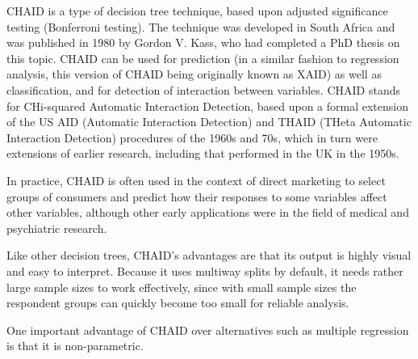 CHAID is a type of decision tree technique, based upon adjusted significance testing (Bonferroni testing). The technique was developed in South Africa and was published in 1980 by Gordon V. Kass, who had completed a PhD thesis on this topic. CHAID can be used for prediction (in a similar fashion to regression analysis, this version of CHAID being originally known as XAID) as well as classification, and for detection of interaction between variables. CHAID stands for CHi-squared Automatic Interaction Detection, based upon a formal extension of the US AID (Automatic Interaction Detection) and THAID (THeta Automatic Interaction Detection) procedures of the 1960s and 70s, which in turn were extensions of earlier research, including that performed in the UK in the 1950s.

In practice, CHAID is often used in the context of direct marketing to select groups of consumers and predict how their responses to some variables affect other variables, although other early applications were in the field of medical and psychiatric research.

Like other decision trees, CHAID's advantages are that its output is highly visual and easy to interpret. Because it uses multiway splits by default, it needs rather large sample sizes to work effectively, since with small sample sizes the respondent groups can quickly become too small for reliable analysis.

One important advantage of CHAID over alternatives such as multiple regression is that it is non-parametric.

